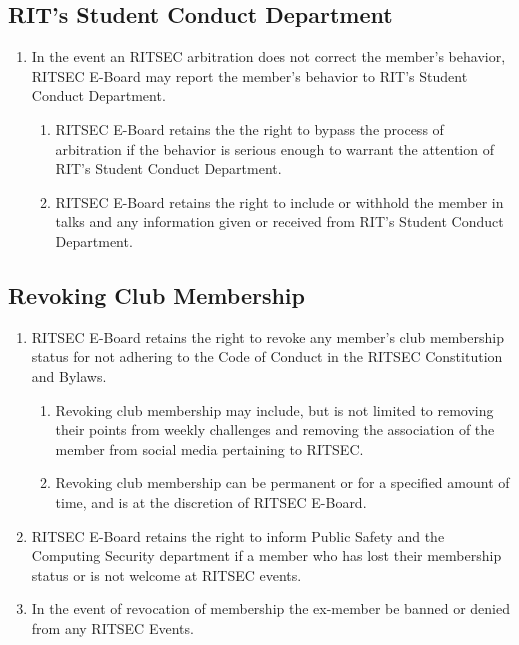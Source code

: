 \documentclass{article}
\begin{document}
\subsection{RIT's Student Conduct Department}

\begin{enumerate}
  \item In the event an RITSEC arbitration does not correct the member’s
    behavior, RITSEC E-Board may report the member’s behavior to RIT’s Student
    Conduct Department. 
  \begin{enumerate}
    \item RITSEC E-Board retains the the right to bypass the process of
      arbitration if the behavior is serious enough to warrant the attention of
      RIT’s Student Conduct Department.
    \item RITSEC E-Board retains the right to include or withhold the member in
      talks and any information given or received from RIT’s Student Conduct
      Department.
  \end{enumerate}
\end{enumerate}

\subsection{Revoking Club Membership}

\begin{enumerate}
  \item RITSEC E-Board retains the right to revoke any member’s club membership
    status for not adhering to the Code of Conduct in the RITSEC Constitution
    and Bylaws. 
  \begin{enumerate}
    \item Revoking club membership may include, but is not limited to removing
      their points from weekly challenges and removing the association of the
      member from social media pertaining to RITSEC.
    \item Revoking club membership can be permanent or for a specified amount
      of time, and is at the discretion of RITSEC E-Board.
  \end{enumerate}
  \item RITSEC E-Board retains the right to inform Public Safety and the
    Computing Security department if a member who has lost their membership
    status or is not welcome at RITSEC events.
  \item In the event of revocation of membership the ex-member be banned or
    denied from any RITSEC Events.
\end{enumerate}
\end{document}

